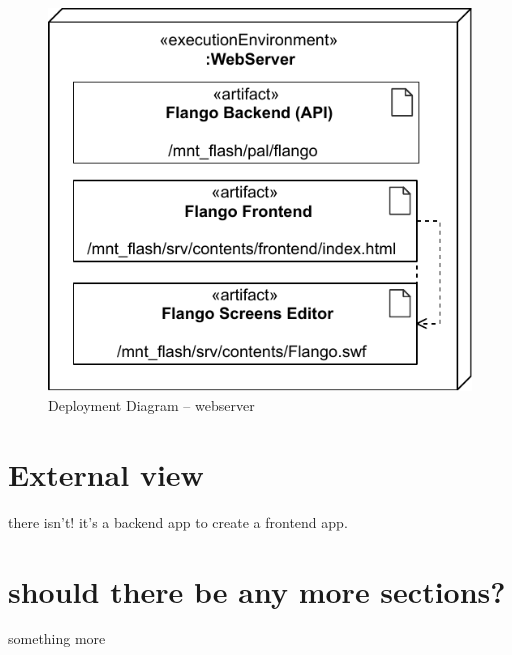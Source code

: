 \begin{figure}[htb]
    \centering
    \includegraphics{figures/design-deployment-webserver.pdf}
    \caption{Deployment Diagram -- webserver}
    \label{fig:deploy-webserver}
\end{figure}

\FloatBarrier


\section{External view}
there isn't! it's a backend app to create a frontend app.

\section{should there be any more sections?}
something more
